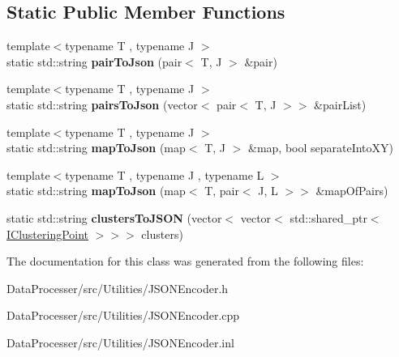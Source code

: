 \subsection*{Static Public Member Functions}
\begin{DoxyCompactItemize}
\item 
\mbox{\label{classJSONEncoder_a7afe6bc64e5edf4a92b7699575da55eb}} 
{\footnotesize template$<$typename T , typename J $>$ }\\static std\+::string {\bfseries pair\+To\+Json} (pair$<$ T, J $>$ \&pair)
\item 
\mbox{\label{classJSONEncoder_a892c911683f18153e4e50d1354bb880c}} 
{\footnotesize template$<$typename T , typename J $>$ }\\static std\+::string {\bfseries pairs\+To\+Json} (vector$<$ pair$<$ T, J $>$$>$ \&pair\+List)
\item 
\mbox{\label{classJSONEncoder_a7d121012e7cf6a5ca957f6325a84074d}} 
{\footnotesize template$<$typename T , typename J $>$ }\\static std\+::string {\bfseries map\+To\+Json} (map$<$ T, J $>$ \&map, bool separate\+Into\+XY)
\item 
\mbox{\label{classJSONEncoder_ab60fbd11a4b7744bae8e859b2aeaa6d3}} 
{\footnotesize template$<$typename T , typename J , typename L $>$ }\\static std\+::string {\bfseries map\+To\+Json} (map$<$ T, pair$<$ J, L $>$$>$ \&map\+Of\+Pairs)
\item 
\mbox{\label{classJSONEncoder_aeb8662e05b14151c6b5bbe07d2eef124}} 
static std\+::string {\bfseries clusters\+To\+J\+S\+ON} (vector$<$ vector$<$ std\+::shared\+\_\+ptr$<$ \hyperlink{classIClusteringPoint}{I\+Clustering\+Point} $>$$>$$>$ clusters)
\end{DoxyCompactItemize}


The documentation for this class was generated from the following files\+:\begin{DoxyCompactItemize}
\item 
Data\+Processer/src/\+Utilities/J\+S\+O\+N\+Encoder.\+h\item 
Data\+Processer/src/\+Utilities/J\+S\+O\+N\+Encoder.\+cpp\item 
Data\+Processer/src/\+Utilities/J\+S\+O\+N\+Encoder.\+inl\end{DoxyCompactItemize}
